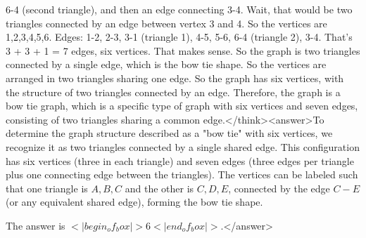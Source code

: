 6-4 (second triangle), and then an edge connecting 3-4. Wait, that would be two triangles connected by an edge between vertex 3 and 4. So the vertices are 1,2,3,4,5,6. Edges: 1-2, 2-3, 3-1 (triangle 1), 4-5, 5-6, 6-4 (triangle 2), 3-4. That's 3 + 3 + 1 = 7 edges, six vertices. That makes sense. So the graph is two triangles connected by a single edge, which is the bow tie shape. So the vertices are arranged in two triangles sharing one edge. So the graph has six vertices, with the structure of two triangles connected by an edge. Therefore, the graph is a bow tie graph, which is a specific type of graph with six vertices and seven edges, consisting of two triangles sharing a common edge.</think><answer>To determine the graph structure described as a "bow tie" with six vertices, we recognize it as two triangles connected by a single shared edge. This configuration has six vertices (three in each triangle) and seven edges (three edges per triangle plus one connecting edge between the triangles). The vertices can be labeled such that one triangle is \(A, B, C\) and the other is \(C, D, E\), connected by the edge \(C-E\) (or any equivalent shared edge), forming the bow tie shape.  

The answer is \(<|begin_of_box|>6<|end_of_box|>\).</answer>